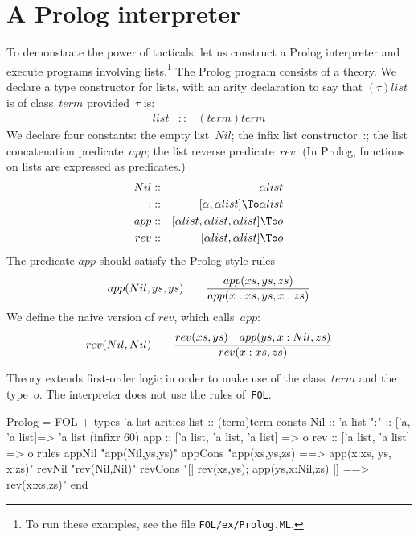 \section{A Prolog interpreter}
To demonstrate the power of tacticals, let us construct a Prolog
interpreter and execute programs involving lists.\footnote{To run these
examples, see the file {\tt FOL/ex/Prolog.ML}.} The Prolog program
consists of a theory.  We declare a type constructor for lists, with an
arity declaration to say that $(\tau)list$ is of class~$term$
provided~$\tau$ is:
\begin{eqnarray*}
  list  & :: & (term)term
\end{eqnarray*}
We declare four constants: the empty list~$Nil$; the infix list
constructor~{:}; the list concatenation predicate~$app$; the list reverse
predicate~$rev$.  (In Prolog, functions on lists are expressed as
predicates.)
\begin{eqnarray*}
    Nil         & :: & \alpha list \\
    {:}         & :: & [\alpha,\alpha list] \To \alpha list \\
    app & :: & [\alpha list,\alpha list,\alpha list] \To o \\
    rev & :: & [\alpha list,\alpha list] \To o 
\end{eqnarray*}
The predicate $app$ should satisfy the Prolog-style rules
\[ {app(Nil,ys,ys)} \qquad
   {app(xs,ys,zs) \over app(x:xs, ys, x:zs)} \]
We define the naive version of $rev$, which calls~$app$:
\[ {rev(Nil,Nil)} \qquad
   {rev(xs,ys)\quad  app(ys, x:Nil, zs) \over
    rev(x:xs, zs)} 
\]

Theory  extends first-order logic in order to make use
of the class~$term$ and the type~$o$.  The interpreter does not use the
rules of~{\tt FOL}.
\begin{ttbox}
Prolog = FOL +
types   'a list
arities list    :: (term)term
consts  Nil     :: 'a list
        ":"     :: ['a, 'a list]=> 'a list            (infixr 60)
        app     :: ['a list, 'a list, 'a list] => o
        rev     :: ['a list, 'a list] => o
rules   appNil  "app(Nil,ys,ys)"
        appCons "app(xs,ys,zs) ==> app(x:xs, ys, x:zs)"
        revNil  "rev(Nil,Nil)"
        revCons "[| rev(xs,ys); app(ys,x:Nil,zs) |] ==> rev(x:xs,zs)"
end
\end{ttbox}

